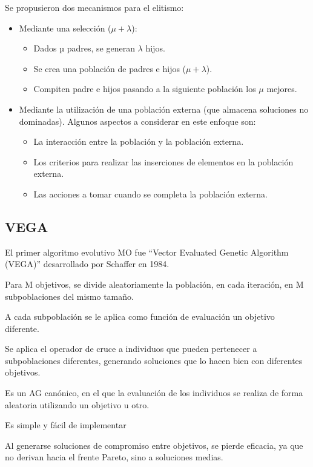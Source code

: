 \documentclass[12pt, twoside, openright]{report} %
\begin{document}
Se propusieron dos mecanismos para el elitismo:
\begin{itemize}
	\item Mediante una selección ($\mu + \lambda$):
	\begin{itemize}
		\item Dados µ padres, se generan $\lambda$ hijos.
		\item Se crea una población de padres e hijos ($\mu + \lambda$).
		\item Compiten padre e hijos pasando a la siguiente población los $\mu$ mejores.
	\end{itemize}
	\pagebreak
	\item Mediante la utilización de una población externa (que almacena soluciones no dominadas). Algunos aspectos a considerar en este enfoque son:
	\begin{itemize}
		\item La interacción entre la población y la población externa.
		\item Los criterios para realizar las inserciones de elementos en la población externa.
		\item Las acciones a tomar cuando se completa la población externa.
	\end{itemize}
\end{itemize}

\subsection{VEGA}
El primer algoritmo evolutivo MO fue “Vector Evaluated Genetic Algorithm (VEGA)” desarrollado por Schaffer en 1984.

Para M objetivos, se divide aleatoriamente la población, en cada iteración, en M subpoblaciones del mismo tamaño.

A cada subpoblación se le aplica como función de evaluación un objetivo diferente.

Se aplica el operador de cruce a individuos que pueden pertenecer a subpoblaciones diferentes, generando soluciones que lo hacen bien con diferentes objetivos.

Es un AG canónico, en el que la evaluación de los individuos se realiza de forma aleatoria utilizando un objetivo u otro.

Es simple y fácil de implementar

Al generarse soluciones de compromiso entre objetivos, se pierde eficacia, ya que no derivan hacia el frente Pareto, sino a soluciones medias.
\end{document}

